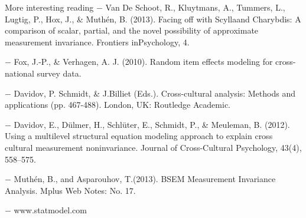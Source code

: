 \documentclass[10pt]{beamer}\usepackage[]{graphicx}\usepackage[]{xcolor}
\begin{document}
%
%
\begin{frame}[fragile]{More interesting reading}
$-$ Van De Schoot, R., Kluytmans, A., Tummers, L., Lugtig, P., Hox, J., \& Muthén, B. (2013). Facing off with Scyllaand Charybdis:  A comparison of scalar, partial, and the novel possibility of approximate measurement invariance. Frontiers inPsychology, 4. 


$-$ Fox, J.-P., \& Verhagen, A. J. (2010). Random item effects modeling for cross-national survey data.


$-$ Davidov, P. Schmidt, \& J.Billiet (Eds.). Cross-cultural analysis: Methods and applications (pp. 467-488). London, UK: Routledge Academic. 


$-$ Davidov, E., Dülmer, H., Schlüter, E., Schmidt, P., \& Meuleman, B. (2012). Using a multilevel structural equation modeling approach to explain cross cultural measurement noninvariance. Journal of Cross-Cultural Psychology, 43(4), 558–575. 


$-$ Muthén, B., and Asparouhov, T.(2013). BSEM Measurement Invariance Analysis.  Mplus Web Notes: No. 17. 


$-$ www.statmodel.com

\end{frame}
%
\end{document}
